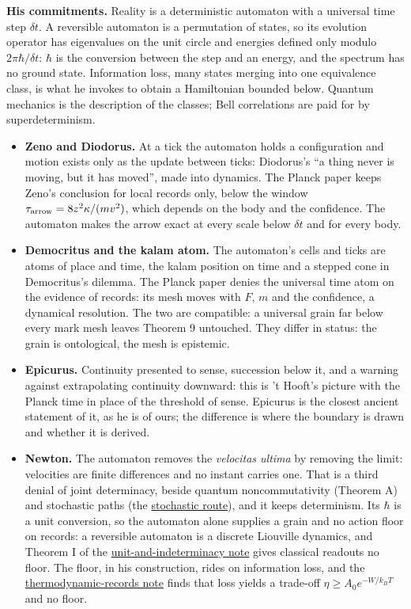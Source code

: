 \documentclass[11pt,a4paper]{article}
\newcommand{\tightlist}{\setlength{\itemsep}{0pt}\setlength{\parskip}{0pt}}
\begin{document}
\textbf{His commitments.} Reality is a deterministic automaton with a
universal time step \(\delta t\). A reversible automaton is a
permutation of states, so its evolution operator has eigenvalues on the
unit circle and energies defined only modulo \(2\pi\hbar/\delta t\):
\(\hbar\) is the conversion between the step and an energy, and the
spectrum has no ground state. Information loss, many states merging into
one equivalence class, is what he invokes to obtain a Hamiltonian
bounded below. Quantum mechanics is the description of the classes; Bell
correlations are paid for by superdeterminism.

\begin{itemize}
\tightlist
\item
  \textbf{Zeno and Diodorus.} At a tick the automaton holds a
  configuration and motion exists only as the update between ticks:
  Diodorus's ``a thing never is moving, but it has moved'', made into
  dynamics. The Planck paper keeps Zeno's conclusion for local records
  only, below the window \(\tau_{\rm arrow}=8z^2\kappa/(mv^2)\), which
  depends on the body and the confidence. The automaton makes the arrow
  exact at every scale below \(\delta t\) and for every body.
\item
  \textbf{Democritus and the kalam atom.} The automaton's cells and
  ticks are atoms of place and time, the kalam position on time and a
  stepped cone in Democritus's dilemma. The Planck paper denies the
  universal time atom on the evidence of records: its mesh moves with
  \(F\), \(m\) and the confidence, a dynamical resolution. The two are
  compatible: a universal grain far below every mark mesh leaves Theorem
  9 untouched. They differ in status: the grain is ontological, the mesh
  is epistemic.
\item
  \textbf{Epicurus.} Continuity presented to sense, succession below it,
  and a warning against extrapolating continuity downward: this is 't
  Hooft's picture with the Planck time in place of the threshold of
  sense. Epicurus is the closest ancient statement of it, as he is of
  ours; the difference is where the boundary is drawn and whether it is
  derived.
\item
  \textbf{Newton.} The automaton removes the \emph{velocitas ultima} by
  removing the limit: velocities are finite differences and no instant
  carries one. That is a third denial of joint determinacy, beside
  quantum noncommutativity (Theorem A) and stochastic paths (the
  \href{stochastic-route-velocitas-ultima.md}{stochastic route}), and it
  keeps determinism. Its \(\hbar\) is a unit conversion, so the
  automaton alone supplies a grain and no action floor on records: a
  reversible automaton is a discrete Liouville dynamics, and Theorem I
  of the
  \href{necessity-unit-and-indeterminacy.md}{unit-and-indeterminacy
  note} gives classical readouts no floor. The floor, in his
  construction, rides on information loss, and the
  \href{thermodynamic-records-no-floor.md}{thermodynamic-records note}
  finds that loss yields a trade-off \(\eta\ge A_0e^{-W/k_BT}\) and no
  floor.
\end{itemize}
\end{document}
